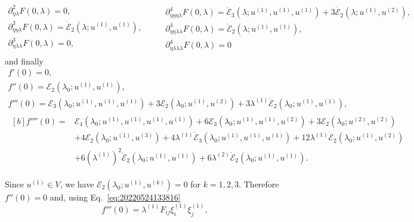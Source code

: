 \documentclass[12pt, final]{scrartcl}
\theoremstyle{definition}
\newcommand{\E}{\mathcal E}
\newcommand{\order}[2][1]{#2^{(#1)}}
\begin{document}
\begin{equation*}
  \begin{gathered}
    ∂_{η\lambda}^2 F(0, \lambda) = 0,\\
    ∂_{ηη\lambda}^3 F(0, \lambda) = \dot{\E}_2(\lambda; \order[1]u, \order[1]u),\\
    ∂_{η\lambda\lambda}^3 F(0, \lambda) = 0,\\
  \end{gathered}
  \qquad
  \begin{gathered}
    ∂_{ηηη\lambda}^4 F(0, \lambda) = \dot{\E}_3(\lambda; \order[1]u, \order[1]u, \order[1]u) + 3\dot{\E}_2(\lambda; \order[1]u, \order[2]u),\\
    ∂_{ηη\lambda\lambda}^4 F(0, \lambda) = \ddot{\E}_2(\lambda; \order[1]u, \order[1]u),\\
    ∂_{η\lambda\lambda\lambda}^4 F(0, \lambda) = 0
  \end{gathered}
\end{equation*}
and finally
\begin{gather}
  f'(0) = 0,\\
  f''(0) = \E_2(\lambda_0; \order[1]u, \order[1]u),\\
  f'''(0) =\E_3(\lambda_0; \order[1]u, \order[1]u, \order[1]u) + 3\E_2(\lambda_0; \order[1]u, \order[2]u) + 3\order[1]\lambda \dot{\E}_2(\lambda_0; \order[1]u, \order[1]u),\\
  \label{eq:20220905063614}
  \begin{aligned}[b]
    f''''(0) ={}
    & \E_4(\lambda_0; \order[1]u, \order[1]u, \order[1]u, \order[1]u) + 6\E_3(\lambda_0; \order[1]u, \order[1]u, \order[2]u) + 3\E_2(\lambda_0; \order[2]u, \order[2]u)\\
    & + 4\E_2(\lambda_0; \order[1]u, \order[3]u) + 4 \order[1]\lambda \dot{\E}_3(\lambda_0; \order[1]u, \order[1]u, \order[1]u) + 12 \order[1]\lambda \dot{\E}_2(\lambda_0; \order[1]u, \order[2]u)\\
    & + 6( \order[1]\lambda )^2 \ddot{\E}_2(\lambda_0; \order[1]u, \order[1]u) + 6\order[2]\lambda \dot{\E}_2(\lambda_0; \order[1]u, \order[1]u).
  \end{aligned}
\end{gather}

Since $\order[1]u \in V$, we have $\E_2(\lambda_0; \order[1]u, \order[k]u) = 0$ for
$k = 1, 2, 3$. Therefore $f''(0)=0$ and, using
Eq.~\eqref{eq:20220524133816}
\begin{equation}
  \label{eq:20220601055448}
  f'''(0) = \order[1]\lambda F_{ij} \order[1]{ξ_i} \order[1]{ξ_j},
\end{equation}
\end{document}

